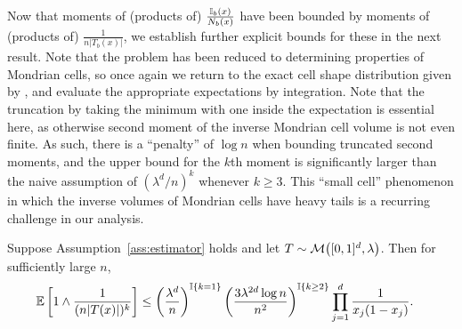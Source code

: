 Now that moments of (products of) $\frac{\mathbb{I}_b(x)}{N_b(x)}$
have been bounded by moments of
(products of) $\frac{1}{n |T_b(x)|}$, we establish further
explicit bounds for these in the next result.
Note that the problem has been reduced to determining
properties of Mondrian cells, so once again we return to the
exact cell shape distribution given by \citet{mourtada2020minimax},
and evaluate the appropriate expectations by integration.
Note that the truncation by taking the minimum with one inside the expectation
is essential here, as otherwise second moment of the inverse Mondrian cell
volume is not even finite. As such, there is a ``penalty'' of $\log n$
when bounding truncated second moments,
and the upper bound for the $k$th moment is significantly
larger than the naive assumption of $(\lambda^d / n)^k$
whenever $k \geq 3$.
This ``small cell'' phenomenon in which the inverse volumes of Mondrian cells
have heavy tails is a recurring challenge in our analysis.

\begin{lemma}%
  \label{lem:moment_cell}

  Suppose Assumption~\ref{ass:estimator} holds
  and let $T \sim \mathcal{M}\big([0,1]^d, \lambda\big)$.
  Then for sufficiently large $n$,
  \begin{align*}
    \mathbb{E}\left[
      1 \wedge
      \frac{1}{(n |T(x)|)^k}
    \right]
    &\leq
    \left(
      \frac{\lambda^d}{n}
    \right)^{\mathbb{I} \left\{ k = 1 \right\}}
    \left(
      \frac{3 \lambda^{2d} \log n}{n^2}
    \right)^{\mathbb{I} \left\{ k \geq 2 \right\}}
    \prod_{j=1}^{d} \frac{1}{x_j (1-x_j)}.
  \end{align*}
\end{lemma}

